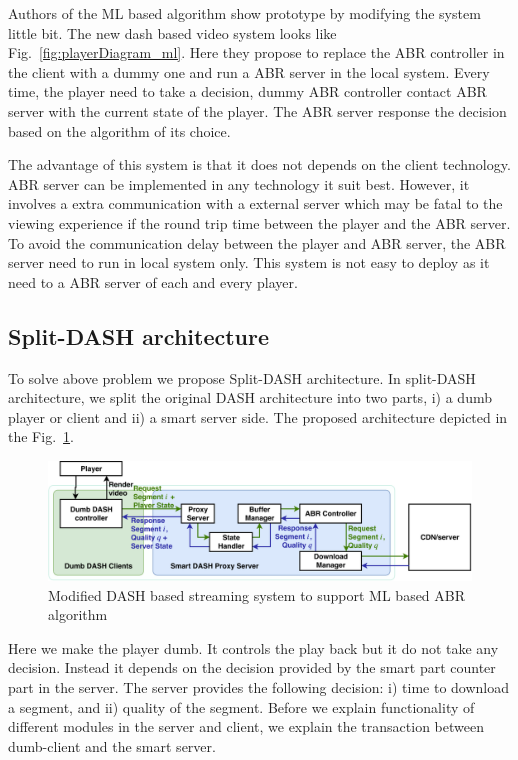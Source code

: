Authors of the ML based algorithm show prototype by modifying the system little bit. The new dash based video system looks like Fig.~\ref{fig:playerDiagram_ml}. Here they propose to replace the ABR controller in the client with a dummy one and run a ABR server in the local system. Every time, the player need to take a decision, dummy ABR controller contact ABR server with the current state of the player. The ABR server response the decision based on the algorithm of its choice.

The advantage of this system is that it does not depends on the client technology. ABR server can be implemented in any technology it suit best. However, it involves a extra communication with a external server which may be fatal to the viewing experience if the round trip time between the player and the ABR server. To avoid the communication delay between the player and ABR server, the ABR server need to run in local system only. This system is not easy to deploy as it need to a ABR server of each and every player.

\subsection{Split-DASH architecture}
\label{sec:Split_DASH_architecture}
To solve above problem we propose Split-DASH architecture. In split-DASH architecture, we split the original DASH architecture into two parts, i) a dumb player or client and ii) a smart server side. The proposed architecture depicted in the Fig.~\ref{fig:playerDiagram_split}.
\begin{figure}[ht]
	\begin{center}
		\includegraphics[width=0.9\linewidth]{img/playerDiagram_split}
	\end{center}
	\caption{\label{fig:playerDiagram_split} Modified DASH based streaming system to support ML based ABR algorithm}
\end{figure}
Here we make the player dumb. It controls the play back but it do not take any decision. Instead it depends on the decision provided by the smart part counter part in the server. The server provides the following decision: i) time to download a segment, and ii) quality of the segment. Before we explain functionality of different modules in the server and client, we explain the transaction between dumb-client and the smart server. 

